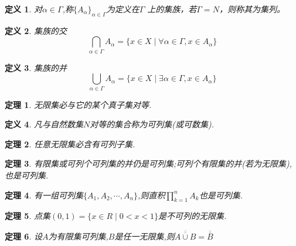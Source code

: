 \documentclass[UTF8]{ctexbook}
\newtheorem{definition}{定义}[chapter]
\newtheorem{thm}{定理}[chapter]
\newcommand{\jhshi}[1]{\overline{\overline{#1}}}
\begin{document}
\begin{definition}
    对$\alpha \in \Gamma$,称$\{ A_{\alpha} \}_{\alpha \in \Gamma}$为定义在$\Gamma$
    上的集族，若$\Gamma = N$，则称其为集列。
\end{definition}

\begin{definition}
    集族的交
    \begin{equation}
    \bigcap_{\alpha \in \Gamma} A_{\alpha} 
    = \{ x \in X \mid \forall \alpha \in \Gamma ,
        x \in A_{\alpha} \}
    \end{equation}
\end{definition}

\begin{definition}
    集族的并
    \begin{equation}
    \bigcup_{\alpha \in \Gamma} A_{\alpha} 
    = \{ x \in X \mid \exists \alpha \in \Gamma ,
    x \in A_{\alpha} \}
    \end{equation}
\end{definition}

\begin{thm}
    无限集必与它的某个真子集对等.
\end{thm}

\begin{definition}
    凡与自然数集$N$对等的集合称为可列集(或可数集).
\end{definition}

\begin{thm}
    任意无限集必含有可列子集.
\end{thm}

\begin{thm}
    有限集或可列个可列集的并仍是可列集;可列个有限集的并(若为无限集),也是可列集.
\end{thm}

\begin{thm}
    有一组可列集$\{ A_1, A_2, \cdots, A_n \}$,则直积$ \prod_{k=1}^n A_k $也是可列集.
\end{thm}

\begin{thm}
    点集$ ( 0, 1)  = \{ x \in R \mid 0 <  x <  1 \} $是不可列的无限集.
\end{thm}

\begin{thm}
    设$A$为有限集可列集,$B$是任一无限集,则$\jhshi{A \cup B} = \jhshi B$
\end{thm}
\end{document}
